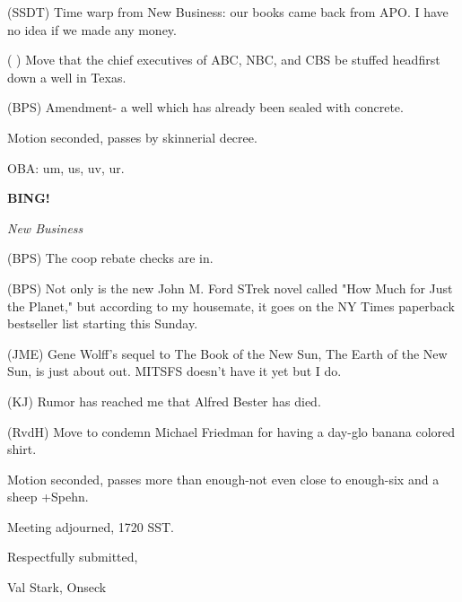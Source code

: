 \documentclass[12pt]{article}
\newcommand{\bing}{{\bf BING!} }
\newcommand{\goto}[1]{\bing \vskip 12pt \centerline{{\em{#1}}}}
\begin{document}
(SSDT) Time warp from New Business: our books came back from APO. I have no idea if we made any money.

( ) Move that the chief executives of ABC, NBC, and CBS be stuffed headfirst down a well in Texas.

(BPS) Amendment- a well which has already been sealed with concrete.

Motion seconded, passes by skinnerial decree.

OBA: um, us, uv, ur.

\goto{New Business}

(BPS) The coop rebate checks are in.

(BPS) Not only is the new John M. Ford STrek novel called "How Much for Just the Planet," but according to my housemate, it goes on the NY Times paperback bestseller list starting this Sunday.

(JME) Gene Wolff's sequel to The Book of the New Sun, The Earth of the New Sun, is just about out. MITSFS doesn't have it yet but I do.

(KJ) Rumor has reached me that Alfred Bester has died.

(RvdH) Move to condemn Michael Friedman for having a day-glo banana colored shirt.

Motion seconded, passes more than enough-not even close to enough-six and a sheep +Spehn.

\vspace{12pt}

\noindent
Meeting adjourned, 1720 SST.

\vspace{18pt}

\centerline{Respectfully submitted,}
\centerline{Val Stark, Onseck}
\end{document}
